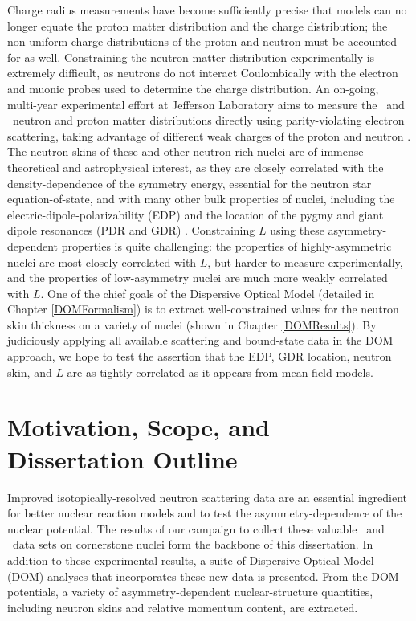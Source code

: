 Charge radius measurements have
become sufficiently precise that models can no longer equate the proton matter
distribution and the charge distribution; the non-uniform charge distributions of the
proton and neutron must be accounted for as well. Constraining the neutron matter
distribution experimentally is extremely difficult, as neutrons do not interact
Coulombically with the electron and muonic probes used to determine the charge
distribution. An on-going, multi-year
experimental effort at Jefferson Laboratory aims to measure the \caEight\ and
\pbEight\ neutron and proton matter distributions directly using parity-violating electron
scattering, taking advantage of different weak charges of the proton and neutron
\cite{Horowitz2014}. The neutron skins of these and other neutron-rich nuclei
are of immense theoretical and astrophysical interest, as they are closely
correlated with the density-dependence of the symmetry energy, essential
for the neutron star equation-of-state, and with many other bulk properties of
nuclei, including the electric-dipole-polarizability (EDP) and the location of the
pygmy and giant dipole resonances (PDR and GDR)
\cite{Vinas2014, Brown2000, Fattoyev2012, Piekarewicz2012, Zhang2018}.
Constraining $L$ using these asymmetry-dependent 
properties is quite challenging: the properties of highly-asymmetric nuclei are
most closely correlated with $L$, but harder to measure experimentally, and the
properties of low-asymmetry nuclei are much more weakly correlated with $L$.
One of the chief goals of the Dispersive Optical
Model (detailed in Chapter \ref{DOMFormalism}) is to extract well-constrained values for the 
neutron skin thickness on a variety of nuclei (shown in Chapter
\ref{DOMResults}). By judiciously applying all available scattering and bound-state
data in the DOM approach, we hope to test the assertion
that the EDP, GDR location, neutron skin, and $L$ are as tightly correlated as
it appears from mean-field models.

\section{Motivation, Scope, and Dissertation Outline}
Improved isotopically-resolved neutron scattering data are an essential ingredient
for better nuclear reaction models and to test the asymmetry-dependence of the
nuclear potential. The results of our campaign to collect these valuable
\tot\ and \el\ data sets on cornerstone nuclei form the backbone of this dissertation.
In addition to these experimental results, a suite of Dispersive Optical Model (DOM) analyses that 
incorporates these new data is presented. From the DOM potentials, a variety of asymmetry-dependent 
nuclear-structure quantities, including neutron skins and relative momentum
content, are extracted.

